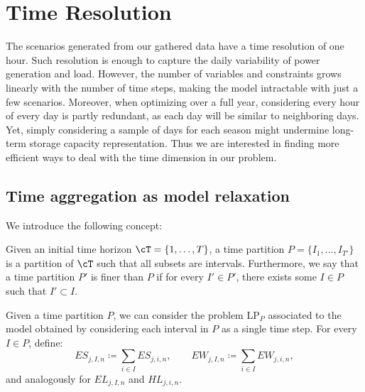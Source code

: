 \documentclass[smallextended,natbib]{svjour3}       %
\numberwithin{theorem}{section}
\begin{document}
\section{Time Resolution}\label{section:time-resolution}


The scenarios generated from our gathered data have a time resolution of one hour. 
Such resolution is enough to capture the daily variability of power generation and load. 
However, the number of variables and constraints grows linearly with the number of time steps, making the model intractable with just a few scenarios.
Moreover, when optimizing over a full year, considering every hour of every day is partly redundant, as each day will be similar to neighboring days. 
Yet, simply considering a sample of days for each season might undermine long-term storage capacity representation. 
Thus we are interested in finding more efficient ways to deal with the time dimension in our problem.

\subsection{Time aggregation as model relaxation}\label{subsection: relax}

We introduce the following concept:
\begin{definition}
Given an initial time horizon \(\cT = \{1, \ldots, T\}\), a time partition \(P=\{I_1,...,I_{T'}\}\) is a partition of \(\cT\) such that all subsets are intervals. 
Furthermore, we say that a time partition \(P'\) is finer than \(P\) if for every \(I' \in P'\), there exists some \(I \in P\) such that \(I' \subset I\).
\end{definition}

Given a time partition $P$, we can consider the problem LP\(_P\) associated to the model obtained by considering each interval in \(P\) as a single time step. 
For every \(I\in P\), define:
\begin{equation}\label{sums scenarios}
ES_{j,I,n} \coloneqq \sum_{i \in I} ES_{j,i,n}, \quad\quad EW_{j,I,n} \coloneqq \sum_{i \in I} EW_{j,i,n}, 
\end{equation}
and analogously for $EL_{j,I,n}$ and $HL_{j,i,n}$.
\end{document}
